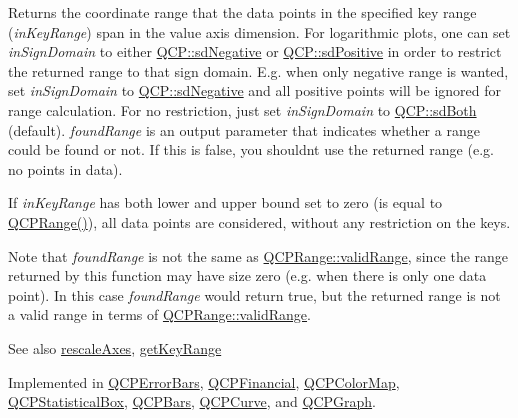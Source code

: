 Returns the coordinate range that the data points in the specified key range ({\itshape in\+Key\+Range}) span in the value axis dimension. For logarithmic plots, one can set {\itshape in\+Sign\+Domain} to either \mbox{\hyperlink{namespace_q_c_p_afd50e7cf431af385614987d8553ff8a9a2d18af0bc58f6528d1e82ce699fe4829}{Q\+C\+P\+::sd\+Negative}} or \mbox{\hyperlink{namespace_q_c_p_afd50e7cf431af385614987d8553ff8a9a584784b75fb816abcc627cf743bb699f}{Q\+C\+P\+::sd\+Positive}} in order to restrict the returned range to that sign domain. E.\+g. when only negative range is wanted, set {\itshape in\+Sign\+Domain} to \mbox{\hyperlink{namespace_q_c_p_afd50e7cf431af385614987d8553ff8a9a2d18af0bc58f6528d1e82ce699fe4829}{Q\+C\+P\+::sd\+Negative}} and all positive points will be ignored for range calculation. For no restriction, just set {\itshape in\+Sign\+Domain} to \mbox{\hyperlink{namespace_q_c_p_afd50e7cf431af385614987d8553ff8a9aa38352ef02d51ddfa4399d9551566e24}{Q\+C\+P\+::sd\+Both}} (default). {\itshape found\+Range} is an output parameter that indicates whether a range could be found or not. If this is false, you shouldn\textquotesingle{}t use the returned range (e.\+g. no points in data).

If {\itshape in\+Key\+Range} has both lower and upper bound set to zero (is equal to {\ttfamily \mbox{\hyperlink{class_q_c_p_range}{Q\+C\+P\+Range()}}}), all data points are considered, without any restriction on the keys.

Note that {\itshape found\+Range} is not the same as \mbox{\hyperlink{class_q_c_p_range_ab38bd4841c77c7bb86c9eea0f142dcc0}{Q\+C\+P\+Range\+::valid\+Range}}, since the range returned by this function may have size zero (e.\+g. when there is only one data point). In this case {\itshape found\+Range} would return true, but the returned range is not a valid range in terms of \mbox{\hyperlink{class_q_c_p_range_ab38bd4841c77c7bb86c9eea0f142dcc0}{Q\+C\+P\+Range\+::valid\+Range}}.

\begin{DoxySeeAlso}{See also}
\mbox{\hyperlink{class_q_c_p_abstract_plottable_a1491c4a606bccd2d09e65e11b79eb882}{rescale\+Axes}}, \mbox{\hyperlink{class_q_c_p_abstract_plottable_a4da16d3cd4b509e1104a9b0275623c96}{get\+Key\+Range}} 
\end{DoxySeeAlso}


Implemented in \mbox{\hyperlink{class_q_c_p_error_bars_ab76215a186ae4862235821e028685f26}{Q\+C\+P\+Error\+Bars}}, \mbox{\hyperlink{class_q_c_p_financial_a82d862aa134d78853f98f8c57a03415b}{Q\+C\+P\+Financial}}, \mbox{\hyperlink{class_q_c_p_color_map_a88134493aaf6b297af34eaab65264fff}{Q\+C\+P\+Color\+Map}}, \mbox{\hyperlink{class_q_c_p_statistical_box_ab3388a21d0c2e86fbc0cba9c06ceb49b}{Q\+C\+P\+Statistical\+Box}}, \mbox{\hyperlink{class_q_c_p_bars_a02cee4bf94d48a1e5f6fc185d9a10477}{Q\+C\+P\+Bars}}, \mbox{\hyperlink{class_q_c_p_curve_a8bb8e3b9085f15921dc40483fb025ab2}{Q\+C\+P\+Curve}}, and \mbox{\hyperlink{class_q_c_p_graph_a8f773e56f191a61c06e129e90a604d77}{Q\+C\+P\+Graph}}.


